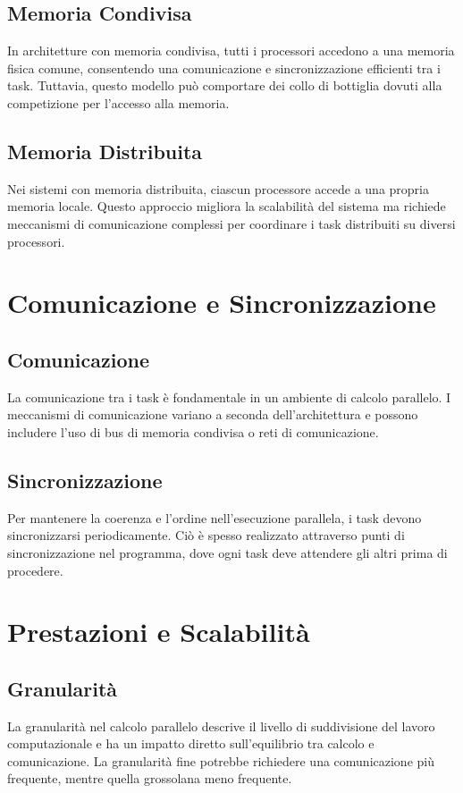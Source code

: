 \subsection{Memoria Condivisa}
In architetture con memoria condivisa, tutti i processori accedono a una memoria fisica comune, consentendo una comunicazione e sincronizzazione efficienti tra i task. Tuttavia, questo modello può comportare dei collo di bottiglia dovuti alla competizione per l'accesso alla memoria.

\subsection{Memoria Distribuita}
Nei sistemi con memoria distribuita, ciascun processore accede a una propria memoria locale. Questo approccio migliora la scalabilità del sistema ma richiede meccanismi di comunicazione complessi per coordinare i task distribuiti su diversi processori.

\section{Comunicazione e Sincronizzazione}

\subsection{Comunicazione}
La comunicazione tra i task è fondamentale in un ambiente di calcolo parallelo. I meccanismi di comunicazione variano a seconda dell'architettura e possono includere l'uso di bus di memoria condivisa o reti di comunicazione.

\subsection{Sincronizzazione}
Per mantenere la coerenza e l'ordine nell'esecuzione parallela, i task devono sincronizzarsi periodicamente. Ciò è spesso realizzato attraverso punti di sincronizzazione nel programma, dove ogni task deve attendere gli altri prima di procedere.

\section{Prestazioni e Scalabilità}

\subsection{Granularità}
La granularità nel calcolo parallelo descrive il livello di suddivisione del lavoro computazionale e ha un impatto diretto sull'equilibrio tra calcolo e comunicazione. La granularità fine potrebbe richiedere una comunicazione più frequente, mentre quella grossolana meno frequente.

